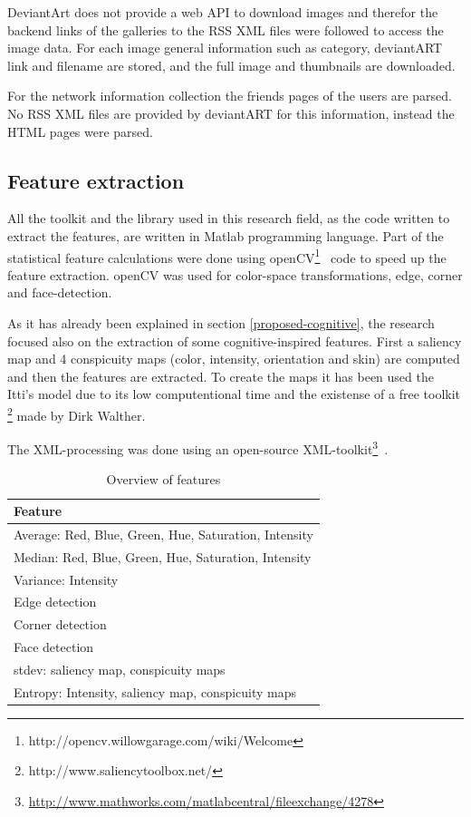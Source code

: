 DeviantArt does not provide a web API to download images and therefor the backend links of the galleries to the RSS XML files were followed to access
the image data. For each image general information such as category, deviantART link and filename are stored, and the full image and 
thumbnails are downloaded.

For the network information collection the friends pages 
of the users are parsed. No RSS XML files are provided by deviantART for this
information, instead the HTML pages were parsed.


\subsection{Feature extraction}
All the toolkit and the library used in this research field, as the code written to extract the features, are written in Matlab programming language.
Part of the statistical feature calculations were done using openCV\footnote{http://opencv.willowgarage.com/wiki/Welcome}~\cite{openCV} code to speed up the feature extraction. openCV was used for color-space transformations, edge, corner and face-detection.

As it has already been explained in section \ref{proposed-cognitive}, the research focused also on the extraction of some cognitive-inspired features. First a saliency map and 4 conspicuity maps (color, intensity, orientation and skin) are computed and then the features are extracted. To create the maps it has been used the Itti's model \cite{Itti_model} due to its low computentional time and the existense of a free toolkit \footnote{http://www.saliencytoolbox.net/} made by Dirk Walther. 

The XML-processing was done using an open-source XML-toolkit\footnote{\url{http://www.mathworks.com/matlabcentral/fileexchange/4278}}~\cite{geusebroek2005six}.

\begin{table}[htb]
    \centering
    \begin{tabular}	{ | l | } 
		\hline
		Feature \\
		\hline
		Average: Red, Blue, Green, Hue, Saturation, Intensity \\
		Median: Red, Blue, Green, Hue, Saturation, Intensity \\
		Variance: Intensity \\
		Edge detection \\
		Corner detection \\
		Face detection \\
		stdev: saliency map, conspicuity maps \\
		Entropy: Intensity, saliency map, conspicuity maps \\
		\hline
    \end{tabular}
    \caption{Overview of features}
    \label{tab:featurelist}
\end{table}

